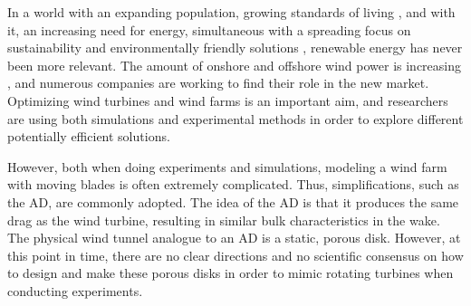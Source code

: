 In a world with an expanding population, growing standards of living \cite{StandardsOfLiving}, and with it, an increasing need for energy, simultaneous with a spreading focus on sustainability and environmentally friendly solutions \cite{sustainabilityFocus} \cite{Veers2019}, renewable energy has never been more relevant. The amount of onshore and offshore wind power is increasing \cite{MoreWind}, and numerous companies are working to find their role in the new market. Optimizing wind turbines and wind farms is an important aim, and researchers are using both simulations and experimental methods in order to explore different potentially efficient solutions. 


However, both when doing experiments and simulations, modeling a wind farm with moving blades is often extremely complicated. Thus, simplifications, such as the \gls{AD}, are commonly adopted. The idea of the \gls{AD} is that it produces the same drag as the wind turbine, resulting in similar bulk characteristics in the wake. The physical wind tunnel analogue to an \gls{AD} is a static, porous disk. However, at this point in time, there are no clear directions and no scientific consensus on how to design and make these porous disks in order to mimic rotating turbines when conducting experiments.  

